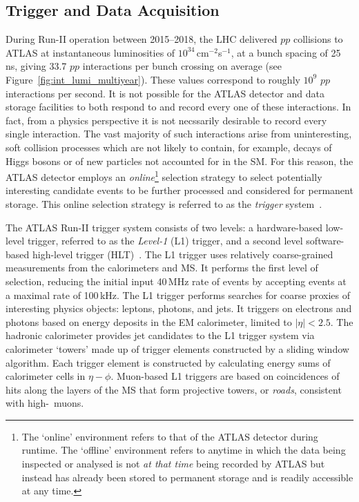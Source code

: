 \subsection{Trigger and Data Acquisition}
\label{sec:tdaq}

During Run-II operation between 2015--2018, the LHC delivered $pp$ collisions to ATLAS at instantaneous luminosities of
$10^{34}$\,cm$^{-2}$s$^{-1}$, at a bunch spacing of 25\,ns, giving 33.7 $pp$ interactions per bunch crossing on average
(see Figure~\ref{fig:int_lumi_multiyear}).
These values correspond to roughly $10^9$ $pp$ interactions per second.
It is not possible for the ATLAS detector and data storage facilities to both respond to and record every one of these interactions.
In fact, from a physics perspective it is not necssarily desirable to record every single interaction.
The vast majority of such interactions arise from uninteresting, soft collision processes which are not likely
to contain, for example, decays of Higgs bosons or of new particles not accounted for in the SM.
For this reason, the ATLAS detector employs an \textit{online}\footnote{The `online' environment refers to that of the
ATLAS detector during runtime. The `offline' environment refers to anytime in which the data being inspected
or analysed is not \textit{at that time} being recorded by ATLAS but instead has already been stored to permanent storage
and is readily accessible at any time.}
selection strategy to select potentially interesting candidate events to be further processed and considered
for permanent storage. This online selection strategy is referred to as the \textit{trigger} system~\cite{Jenni:616089}.

The ATLAS Run-II trigger system consists of two levels: a hardware-based low-level
trigger, referred to as the \textit{Level-1} (L1) trigger, and a second level software-based high-level trigger (HLT)~\cite{PanduroVazquez:2244345}.
The L1 trigger uses relatively coarse-grained measurements from the calorimeters and MS.
It performs the first level of selection, reducing the initial input 40\,MHz rate of events by
accepting events at a maximal rate of 100\,kHz.
The L1 trigger performs searches for coarse proxies of interesting physics objects: leptons, photons, and jets.
It triggers on electrons and photons based on energy deposits in the EM calorimeter, limited to $\lvert \eta \rvert < 2.5$.
The hadronic calorimeter provides jet candidates to the L1 trigger system via calorimeter `towers' made up of
trigger elements constructed by a sliding window algorithm.
Each trigger element is constructed by calculating energy sums of calorimeter cells in $\eta - \phi$.
Muon-based L1 triggers are based on coincidences of hits along the layers of the MS that form
projective towers, or \textit{roads}, consistent with high-\pT~muons.

